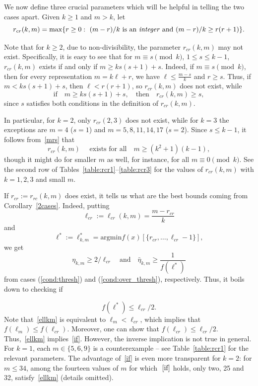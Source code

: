\documentclass[reqno, 12pt]{amsart}
\numberwithin{equation}{section}
\numberwithin{figure}{section}
\def\argmin{\text{argmin}}
\theoremstyle{plain}
\theoremstyle{definition}
\begin{document}
We now define three crucial parameters which will be helpful in telling the two cases apart.
Given $k\ge1$ and $m>k$, let
$$r_{cr}(k,m)=\max\{r\ge0:\ (m-r)/k \mbox{ is an \emph{integer} and } (m-r)/k\ge r(r+1)\}.$$

Note that for $k\ge2$, due to non-divisibility, the parameter $r_{cr}(k,m)$ may not exist.
Specifically, it is easy to see that for $m\equiv s\pmod{k}$, $1\le s\le k-1$, $r_{cr}(k,m)$  exists if and only if $m\ge ks(s+1)+s$. Indeed, if $m\equiv s \pmod{k}$, then for every representation $m=k\ell +r$, we have $\ell\le \frac{m-s}k$ and $r\ge s$. Thus, if $m<ks(s+1)+s$, then  $\ell<r(r+1)$, so $r_{cr}(k,m)$ does not exist, while
\begin{equation}\label{mrs}
\mbox{if}\quad m\ge ks(s+1)+s,\quad\mbox{then}\quad r_{cr}(k,m)\ge s,
\end{equation}
since $s$ satisfies both conditions in the definition of $r_{cr}(k,m)$.

In particular, for $k=2$, only $r_{cr}(2,3)$ does not exist, while for $k=3$ the exceptions are $m=4$ ($s=1$) and $m= 5,8,11,14,17$ ($s=2$). Since $s\le k-1$, it follows from~\eqref{mrs} that
\begin{equation}\label{rkm}
r_{cr}(k,m)\quad\mbox{ exists for all}\quad m\ge (k^2+1)(k-1),
 \end{equation}
 though it might do for smaller $m$ as well, for instance, for all $m\equiv 0 \pmod{k}$. See the second row of Tables~\ref{table:rcr1}--\ref{table:rcr3} for the values of $r_{cr}(k,m)$ with $k=1,2,3$ and  small $m$.
	
If $r_{cr}:=r_{rc}(k,m)$ does exist, it tells us what are the best bounds coming from Corollary~\ref{2cases}. Indeed,
putting
$$\ell_{cr}:=\ell_{cr}(k,m)=\frac{m-r_{cr}}k$$
and
$$\ell^*:=\ell^*_{k,m}=\argmin f(x)[\{r_{cr},\dots,\ell_{cr}-1\}],$$
we get
\begin{equation}
\eta_{k, m}\ge 2/\ell_{cr} \quad \text{and} \quad \bar\eta_{k,m}\ge\frac1{f(\ell^*)}
\end{equation}
from cases (\ref{cond:thresh}) and (\ref{cond:over_thresh}), respectively. Thus, it boils down to checking if

\begin{equation}\label{if}
f(\ell^*)\le\ell_{cr}/2.
\end{equation}
Note that~\eqref{ellkm} is equivalent to $\ell_m<\ell_{cr}$, which implies that $f(\ell_m)\le f(\ell_{cr})$. Moreover, one can show that $f(\ell_{cr})\le\ell_{cr}/2$. Thus,~\eqref{ellkm} implies~\eqref{if}. However, the inverse implication is not true in general. For $k=1$, each $m\in\{5,6,9\}$ is a counterexample -- see Table~\ref{table:rcr1} for the relevant parameters. The advantage of~\eqref{if}  is even more transparent for $k=2$: for $m\le34$, among the fourteen values of $m$ for which $~\eqref{if}$ holds, only  two, 25 and 32, satisfy~\eqref{ellkm} (details omitted).
\end{document}
